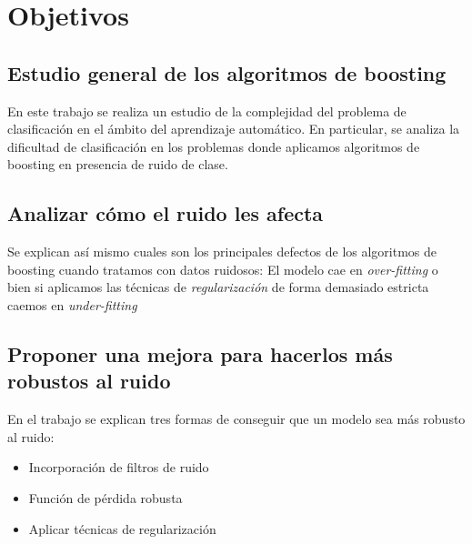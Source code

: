 \chapter{Objetivos}

\section{Estudio general de los algoritmos de boosting}
En este trabajo se realiza un estudio de la complejidad del problema de clasificación en el ámbito del aprendizaje automático. En particular, se analiza la dificultad de clasificación en los problemas donde aplicamos algoritmos de boosting en presencia de ruido de clase.

\section{Analizar cómo el ruido les afecta}
Se explican así mismo cuales son los principales defectos de los algoritmos de boosting cuando tratamos con datos ruidosos: El modelo cae en \textit{over-fitting} o bien si aplicamos las técnicas de \textit{regularización} de forma demasiado estricta caemos en \textit{under-fitting}


\section{Proponer una mejora para hacerlos más robustos al ruido}
En el trabajo se explican tres formas de conseguir que un modelo sea más robusto al ruido:
\begin{itemize}
\item{Incorporación de filtros de ruido}
\item{Función de pérdida robusta}
\item{Aplicar técnicas de regularización}

\end{itemize}